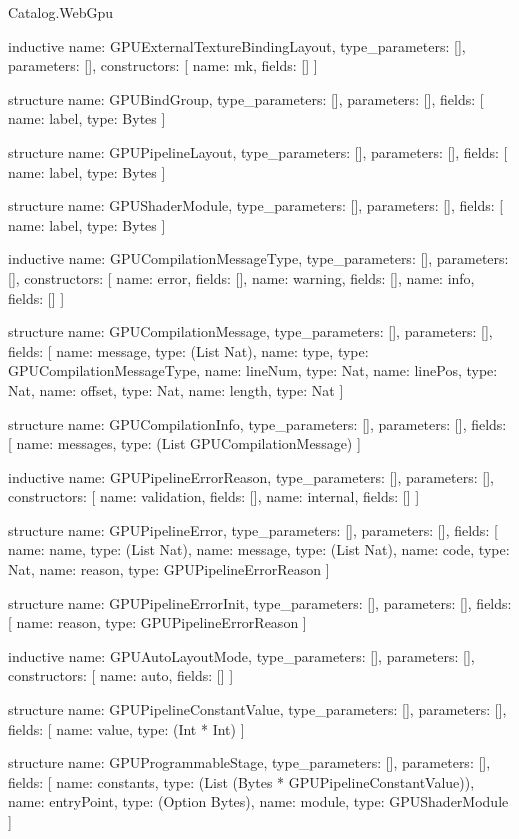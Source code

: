 \begin{lexlean}{Catalog.WebGpu}
\begin{semanticmodule}
inductive{
  name: GPUExternalTextureBindingLayout,
  type_parameters: [],
  parameters: [],
  constructors: [
    {name: mk, fields: []}
  ]
}

structure{
  name: GPUBindGroup,
  type_parameters: [],
  parameters: [],
  fields: [
    {name: label, type: Bytes}
  ]
}

structure{
  name: GPUPipelineLayout,
  type_parameters: [],
  parameters: [],
  fields: [
    {name: label, type: Bytes}
  ]
}

structure{
  name: GPUShaderModule,
  type_parameters: [],
  parameters: [],
  fields: [
    {name: label, type: Bytes}
  ]
}

inductive{
  name: GPUCompilationMessageType,
  type_parameters: [],
  parameters: [],
  constructors: [
    {name: error, fields: []},
    {name: warning, fields: []},
    {name: info, fields: []}
  ]
}

structure{
  name: GPUCompilationMessage,
  type_parameters: [],
  parameters: [],
  fields: [
    {name: message, type: (List Nat)},
    {name: type, type: GPUCompilationMessageType},
    {name: lineNum, type: Nat},
    {name: linePos, type: Nat},
    {name: offset, type: Nat},
    {name: length, type: Nat}
  ]
}

structure{
  name: GPUCompilationInfo,
  type_parameters: [],
  parameters: [],
  fields: [
    {name: messages, type: (List GPUCompilationMessage)}
  ]
}

inductive{
  name: GPUPipelineErrorReason,
  type_parameters: [],
  parameters: [],
  constructors: [
    {name: validation, fields: []},
    {name: internal, fields: []}
  ]
}

structure{
  name: GPUPipelineError,
  type_parameters: [],
  parameters: [],
  fields: [
    {name: name, type: (List Nat)},
    {name: message, type: (List Nat)},
    {name: code, type: Nat},
    {name: reason, type: GPUPipelineErrorReason}
  ]
}

structure{
  name: GPUPipelineErrorInit,
  type_parameters: [],
  parameters: [],
  fields: [
    {name: reason, type: GPUPipelineErrorReason}
  ]
}

inductive{
  name: GPUAutoLayoutMode,
  type_parameters: [],
  parameters: [],
  constructors: [
    {name: auto, fields: []}
  ]
}

structure{
  name: GPUPipelineConstantValue,
  type_parameters: [],
  parameters: [],
  fields: [
    {name: value, type: (Int * Int)}
  ]
}

structure{
  name: GPUProgrammableStage,
  type_parameters: [],
  parameters: [],
  fields: [
    {name: constants, type: (List (Bytes * GPUPipelineConstantValue))},
    {name: entryPoint, type: (Option Bytes)},
    {name: module, type: GPUShaderModule}
  ]
}


\end{semanticmodule}
\end{lexlean}
